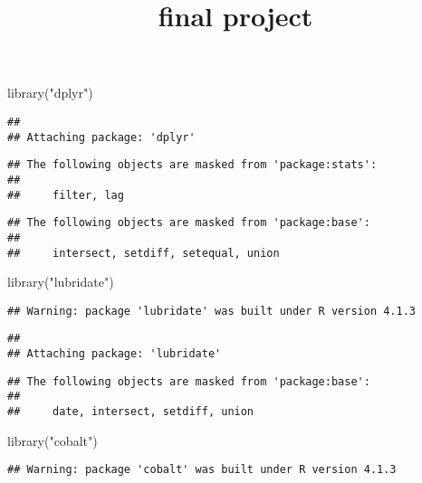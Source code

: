 \documentclass[
]{article}
\title{final project}
\author{}
\date{\vspace{-2.5em}}
\newenvironment{Shaded}{\begin{snugshade}}{\end{snugshade}}
\newcommand{\FunctionTok}[1]{\textcolor[rgb]{0.00,0.00,0.00}{#1}}
\newcommand{\NormalTok}[1]{#1}
\newcommand{\StringTok}[1]{\textcolor[rgb]{0.31,0.60,0.02}{#1}}
\begin{document}
\maketitle

\begin{Shaded}
\begin{Highlighting}[]
\FunctionTok{library}\NormalTok{(}\StringTok{"dplyr"}\NormalTok{)}
\end{Highlighting}
\end{Shaded}

\begin{verbatim}
## 
## Attaching package: 'dplyr'
\end{verbatim}

\begin{verbatim}
## The following objects are masked from 'package:stats':
## 
##     filter, lag
\end{verbatim}

\begin{verbatim}
## The following objects are masked from 'package:base':
## 
##     intersect, setdiff, setequal, union
\end{verbatim}

\begin{Shaded}
\begin{Highlighting}[]
\FunctionTok{library}\NormalTok{(}\StringTok{"lubridate"}\NormalTok{)}
\end{Highlighting}
\end{Shaded}

\begin{verbatim}
## Warning: package 'lubridate' was built under R version 4.1.3
\end{verbatim}

\begin{verbatim}
## 
## Attaching package: 'lubridate'
\end{verbatim}

\begin{verbatim}
## The following objects are masked from 'package:base':
## 
##     date, intersect, setdiff, union
\end{verbatim}

\begin{Shaded}
\begin{Highlighting}[]
\FunctionTok{library}\NormalTok{(}\StringTok{"cobalt"}\NormalTok{)}
\end{Highlighting}
\end{Shaded}

\begin{verbatim}
## Warning: package 'cobalt' was built under R version 4.1.3
\end{verbatim}
\end{document}
